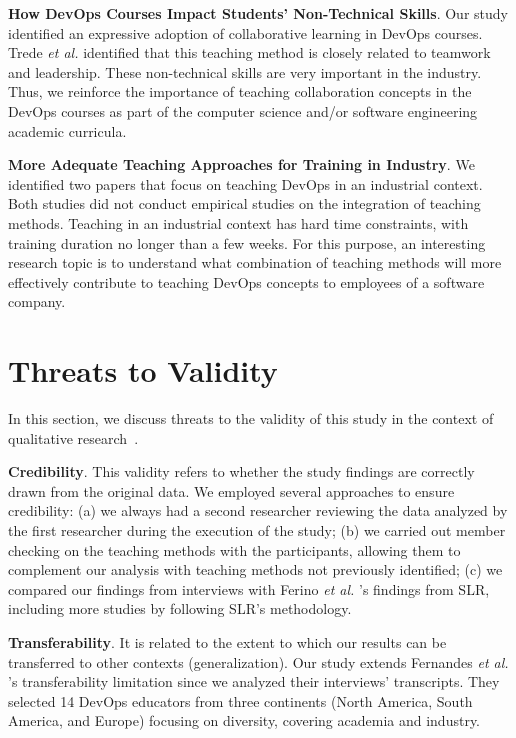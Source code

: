 \documentclass[10pt,conference]{IEEEtran}
\begin{document}
{\textbf{How DevOps Courses Impact Students' Non-Technical Skills}.} Our study identified an expressive adoption of collaborative learning in DevOps courses. Trede \textit{et al.} \cite{trede:2021} identified that this teaching method is closely related to teamwork and leadership. These non-technical skills are very important in the industry. Thus, we reinforce the importance of teaching collaboration concepts in the DevOps courses as part of the computer science and/or software engineering academic curricula.



\textbf{More Adequate Teaching Approaches for Training in Industry}.  We identified two papers \cite{bobrov:2019_pp, mazzara:2018_pp} that focus on teaching DevOps in an industrial context. Both studies did not conduct empirical studies on the integration of teaching methods. Teaching in an industrial context has hard time constraints, with training duration no longer than a few weeks. For this purpose, an interesting research topic is to understand what combination of teaching methods will more effectively contribute to teaching DevOps concepts to employees of a software company.

\section{Threats to Validity} \label{sec:threatsToValidity}

In this section, we discuss threats to the validity of this study in the context of qualitative research~\cite{fernandes:2022, larios:2020, guba:1981, korstjens:2018}.

{\textbf{Credibility}.} This validity refers to whether the study findings are correctly drawn from the original data. We employed several approaches to ensure credibility: (a) we always had a second researcher reviewing the data analyzed by the first researcher during the execution of the study; (b) we carried out member checking on the teaching methods with the participants, allowing them to complement our analysis with teaching methods not previously identified; (c) we compared our findings from interviews with Ferino \textit{et al.} \cite{ferino:2021}'s findings from SLR, including more studies by following SLR's methodology.

{\textbf{Transferability}.} It is related to the extent to which our results can be transferred to other contexts (generalization). Our study extends Fernandes \textit{et al.} \cite{fernandes:2022}'s transferability limitation since we analyzed their interviews' transcripts. They selected 14 DevOps educators from three continents (North America, South America, and Europe) focusing on diversity, covering academia and industry.
\end{document}
